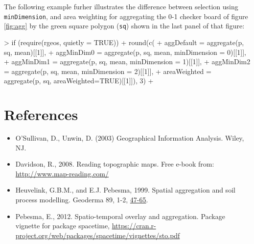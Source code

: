 \documentclass{article}
\begin{document}
The following example furher illustrates the difference between selection
using {\tt minDimension}, and area weighting for aggregating the 0-1 checker
board of figure \ref{fig:agg} by the green square polygon ({\tt sq}) 
shown in the last panel of that figure:
\begin{Schunk}
\begin{Sinput}
> if (require(rgeos, quietly = TRUE)) {
+ round(c(
+   aggDefault = aggregate(p, sq, mean)[[1]],
+   aggMinDim0 = aggregate(p, sq, mean, minDimension = 0)[[1]],
+   aggMinDim1 = aggregate(p, sq, mean, minDimension = 1)[[1]],
+   aggMinDim2 = aggregate(p, sq, mean, minDimension = 2)[[1]],
+   areaWeighted = aggregate(p, sq, areaWeighted=TRUE)[[1]]), 3)
+ }
\end{Sinput}
\end{Schunk}



\section*{References}
\begin{itemize}
\item O'Sullivan, D., Unwin, D. (2003) Geographical Information
Analysis. Wiley, NJ.
\item
Davidson, R., 2008.  Reading topographic maps. Free e-book from:
\url{http://www.map-reading.com/}
\item
Heuvelink, G.B.M., and E.J. Pebesma, 1999.  Spatial aggregation
and soil process modelling. Geoderma 89, 1-2, 
\href{http://dx.doi.org/10.1016/S0016-7061(98)00077-9}{47-65}.
\item
Pebesma, E., 2012.  Spatio-temporal overlay and
aggregation.  Package vignette for package spacetime,
\url{https://cran.r-project.org/web/packages/spacetime/vignettes/sto.pdf}

\end{itemize}
\end{document}
